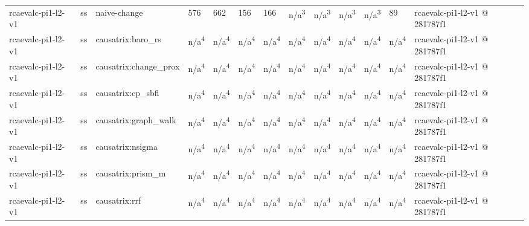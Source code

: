 \begin{table}[t]
\begin{tabular}{lllllllllllll}
rcaevalc-pi1-l2-v1 & ss & naive-change & 576 & 662 & 156 & 166 & n/a\textsuperscript{3} & n/a\textsuperscript{3} & n/a\textsuperscript{3} & n/a\textsuperscript{3} & 89 & rcaevalc-pi1-l2-v1 @ 281787f1 \\
rcaevalc-pi1-l2-v1 & ss & causatrix:baro\_rs & n/a\textsuperscript{4} & n/a\textsuperscript{4} & n/a\textsuperscript{4} & n/a\textsuperscript{4} & n/a\textsuperscript{4} & n/a\textsuperscript{4} & n/a\textsuperscript{4} & n/a\textsuperscript{4} & n/a\textsuperscript{4} & rcaevalc-pi1-l2-v1 @ 281787f1 \\
rcaevalc-pi1-l2-v1 & ss & causatrix:change\_prox & n/a\textsuperscript{4} & n/a\textsuperscript{4} & n/a\textsuperscript{4} & n/a\textsuperscript{4} & n/a\textsuperscript{4} & n/a\textsuperscript{4} & n/a\textsuperscript{4} & n/a\textsuperscript{4} & n/a\textsuperscript{4} & rcaevalc-pi1-l2-v1 @ 281787f1 \\
rcaevalc-pi1-l2-v1 & ss & causatrix:cp\_sbfl & n/a\textsuperscript{4} & n/a\textsuperscript{4} & n/a\textsuperscript{4} & n/a\textsuperscript{4} & n/a\textsuperscript{4} & n/a\textsuperscript{4} & n/a\textsuperscript{4} & n/a\textsuperscript{4} & n/a\textsuperscript{4} & rcaevalc-pi1-l2-v1 @ 281787f1 \\
rcaevalc-pi1-l2-v1 & ss & causatrix:graph\_walk & n/a\textsuperscript{4} & n/a\textsuperscript{4} & n/a\textsuperscript{4} & n/a\textsuperscript{4} & n/a\textsuperscript{4} & n/a\textsuperscript{4} & n/a\textsuperscript{4} & n/a\textsuperscript{4} & n/a\textsuperscript{4} & rcaevalc-pi1-l2-v1 @ 281787f1 \\
rcaevalc-pi1-l2-v1 & ss & causatrix:nsigma & n/a\textsuperscript{4} & n/a\textsuperscript{4} & n/a\textsuperscript{4} & n/a\textsuperscript{4} & n/a\textsuperscript{4} & n/a\textsuperscript{4} & n/a\textsuperscript{4} & n/a\textsuperscript{4} & n/a\textsuperscript{4} & rcaevalc-pi1-l2-v1 @ 281787f1 \\
rcaevalc-pi1-l2-v1 & ss & causatrix:prism\_m & n/a\textsuperscript{4} & n/a\textsuperscript{4} & n/a\textsuperscript{4} & n/a\textsuperscript{4} & n/a\textsuperscript{4} & n/a\textsuperscript{4} & n/a\textsuperscript{4} & n/a\textsuperscript{4} & n/a\textsuperscript{4} & rcaevalc-pi1-l2-v1 @ 281787f1 \\
rcaevalc-pi1-l2-v1 & ss & causatrix:rrf & n/a\textsuperscript{4} & n/a\textsuperscript{4} & n/a\textsuperscript{4} & n/a\textsuperscript{4} & n/a\textsuperscript{4} & n/a\textsuperscript{4} & n/a\textsuperscript{4} & n/a\textsuperscript{4} & n/a\textsuperscript{4} & rcaevalc-pi1-l2-v1 @ 281787f1 \\

\end{tabular}
\end{table}
